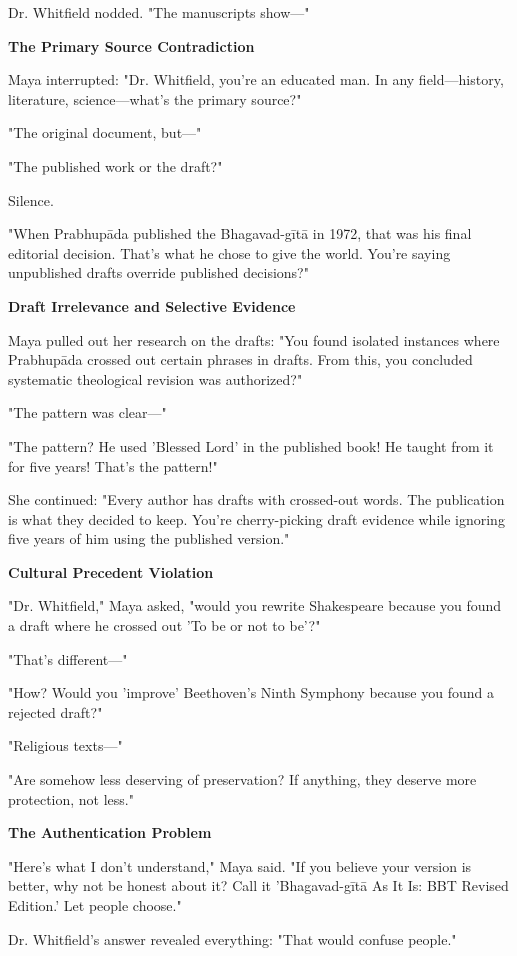 \documentclass[11pt,twoside]{book}
\begin{document}
Dr. Whitfield nodded. "The manuscripts show—"

\textbf{\textbf{The Primary Source Contradiction}}

Maya interrupted: "Dr. Whitfield, you're an educated man. In any field—history, literature, science—what's the primary source?"

"The original document, but—"

"The published work or the draft?"

Silence.

"When Prabhupāda published the Bhagavad-gītā in 1972, that was his final editorial decision. That's what he chose to give the world. You're saying unpublished drafts override published decisions?"

\textbf{\textbf{\textbf{Draft Irrelevance and Selective Evidence}}}

Maya pulled out her research on the drafts: "You found isolated instances where Prabhupāda crossed out certain phrases in drafts. From this, you concluded systematic theological revision was authorized?"

"The pattern was clear—"

"The pattern? He used 'Blessed Lord' in the published book! He taught from it for five years! That's the pattern!"

She continued: "Every author has drafts with crossed-out words. The publication is what they decided to keep. You're cherry-picking draft evidence while ignoring five years of him using the published version."

\textbf{\textbf{\textbf{Cultural Precedent Violation}}}

"Dr. Whitfield," Maya asked, "would you rewrite Shakespeare because you found a draft where he crossed out 'To be or not to be'?"

"That's different—"

"How? Would you 'improve' Beethoven's Ninth Symphony because you found a rejected draft?"

"Religious texts—"

"Are somehow less deserving of preservation? If anything, they deserve more protection, not less."

\textbf{\textbf{\textbf{The Authentication Problem}}}

"Here's what I don't understand," Maya said. "If you believe your version is better, why not be honest about it? Call it 'Bhagavad-gītā As It Is: BBT Revised Edition.' Let people choose."

Dr. Whitfield's answer revealed everything: "That would confuse people."
\end{document}

